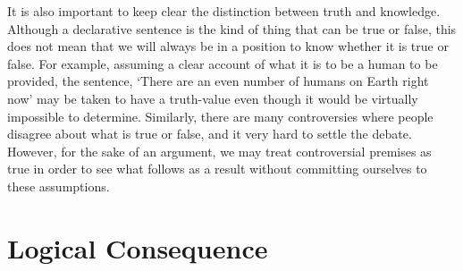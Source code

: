 
It is also important to keep clear the distinction between truth and knowledge.
Although a declarative sentence is the kind of thing that can be true or false, this does not mean that we will always be in a position to know whether it is true or false.
For example, assuming a clear account of what it is to be a human to be provided, the sentence, `There are an even number of humans on Earth right now' may be taken to have a truth-value even though it would be virtually impossible to determine. %
Similarly, there are many controversies where people disagree about what is true or false, and it very hard to settle the debate.
However, for the sake of an argument, we may treat controversial premises as true in order to see what follows as a result without committing ourselves to these assumptions.






\section{Logical Consequence}
  \label{sec:LogicalConsequence}

